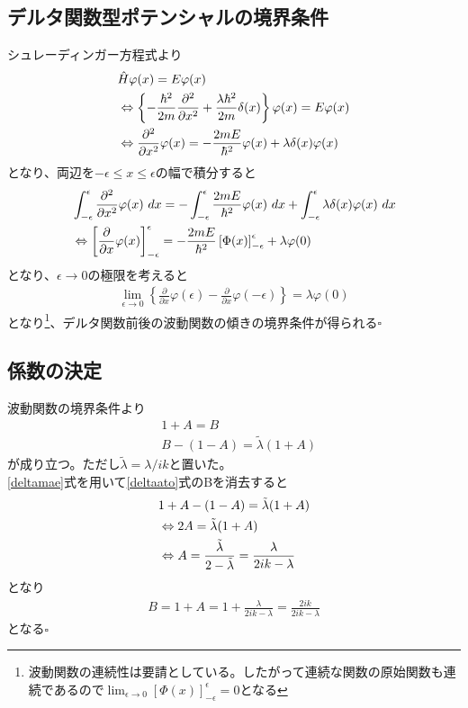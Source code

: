 \documentclass{jsarticle}  %
\numberwithin{equation}{section} %
\numberwithin{figure}{section}
\begin{document}
\subsection{デルタ関数型ポテンシャルの境界条件}
    シュレーディンガー方程式より
    \begin{align}
        &\hat{H}\varphi(x) = E \varphi(x)\notag \\
        &\Leftrightarrow \left\{ -\frac{\hbar^2}{2m}\frac{\partial^2}{\partial x^2} + \frac{\lambda \hbar^2}{2m}\delta(x) \right\} \varphi(x) = E \varphi(x) \notag \\
        &\Leftrightarrow \frac{\partial^2 }{\partial x^2} \varphi (x) = -\frac{2mE}{\hbar^2} \varphi(x) +  \lambda \delta(x) \varphi(x)
    \end{align}
    となり、両辺を$-\epsilon \le x \le \epsilon$の幅で積分すると
    \begin{align}
        &\int_{-\epsilon}^{\epsilon} \frac{\partial^2 }{\partial x^2} \varphi (x)\ dx= -\int_{-\epsilon}^{\epsilon} \frac{2mE}{\hbar^2} \varphi(x)\ dx + \int_{-\epsilon}^{\epsilon} \lambda \delta(x)\varphi(x) \ dx \notag \\
        &\Leftrightarrow \left[ \frac{\partial}{\partial x} \varphi(x) \right]_{-\epsilon}^{\epsilon} = -\frac{2mE}{\hbar^2} \left[ \Phi(x) \right]_{-\epsilon}^{\epsilon} + \lambda \varphi(0)
    \end{align}
    となり、$\epsilon \rightarrow 0$の極限を考えると
    \begin{align}
        \lim_{\epsilon\rightarrow0}\left\{ \frac{\partial}{\partial x}\varphi(\epsilon) -  \frac{\partial}{\partial x}\varphi(-\epsilon)\right\} = \lambda \varphi(0)
    \end{align}
    となり\footnote{波動関数の連続性は要請としている。したがって連続な関数の原始関数も連続であるので$\lim_{\epsilon\rightarrow0} \left[ \Phi(x) \right]_{-\epsilon}^{\epsilon} = 0 $となる}、デルタ関数前後の波動関数の傾きの境界条件が得られる$\square$
\subsection{係数の決定}
    波動関数の境界条件より
    \begin{align}
        &1 + A = B  \label{deltamae}\\
        &B-(1 - A) = \tilde{\lambda} (1 + A) \label{deltaato}
    \end{align}
    が成り立つ。ただし$\tilde{\lambda} = \lambda / ik$と置いた。\\
    \eqref{deltamae}式を用いて\eqref{deltaato}式のBを消去すると
    \begin{align}
        &1 + A - (1 - A) = \tilde{\lambda} (1 + A) \notag \\
        &\Leftrightarrow 2A = \tilde{\lambda} (1 + A) \notag \\
        &\Leftrightarrow A = \frac{\tilde{\lambda}}{2 - \tilde{\lambda}}  = \frac{\lambda}{2ik - \lambda}
    \end{align}
    となり
    \begin{align}
        B = 1 + A = 1 + \frac{\lambda}{2ik - \lambda} = \frac{2ik}{2ik - \lambda}
    \end{align}
    となる$\square$
\end{document}
